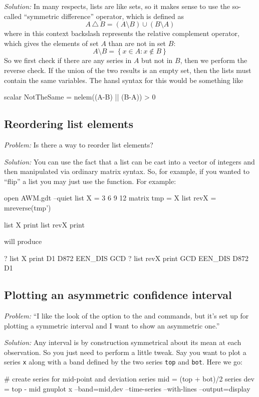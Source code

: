 \emph{Solution:} In many respects, lists are like sets, so it makes
sense to use the so-called ``symmetric difference'' operator, which is
defined as
\[
A\,\triangle\,B = (A \setminus B) \cup (B \setminus A)
\]
where in this context backslash represents the relative complement
operator, which gives the elements of set $A$ than are not in set $B$:
\[
A \setminus B = \left\{ x \in A : x \not \in B \right\}
\]
So we first check if there are any series in $A$ but not in $B$, then
we perform the reverse check. If the union of the two results is an
empty set, then the lists must contain the same variables. The hansl
syntax for this would be something like
\begin{code}
scalar NotTheSame = nelem((A-B) || (B-A)) > 0
\end{code}

\subsection{Reordering list elements}

\emph{Problem:} Is there a way to reorder list elements?

\emph{Solution:} You can use the fact that a list can be cast into
a vector of integers and then manipulated via ordinary matrix
syntax. So, for example, if you wanted to ``flip'' a list you may
just use the  function. For example:
\begin{code}
open AWM.gdt --quiet
list X = 3 6 9 12
matrix tmp = X
list revX = mreverse(tmp')

list X print
list revX print
\end{code}
will produce
\begin{code}
? list X print
D1 D872 EEN_DIS GCD
? list revX print
GCD EEN_DIS D872 D1
\end{code}

\subsection{Plotting an asymmetric confidence interval}

\emph{Problem:} ``I like the look of the  option to the
 and  commands, but it's set up for plotting a
symmetric interval and I want to show an asymmetric one.''

\emph{Solution:} Any interval is by construction symmetrical about its
mean at each observation. So you just need to perform a little
tweak. Say you want to plot a series \texttt{x} along with a band
defined by the two series \texttt{top} and \texttt{bot}. Here we go:
\begin{code}
# create series for mid-point and deviation
series mid = (top + bot)/2
series dev = top - mid
gnuplot x --band=mid,dev --time-series --with-lines --output=display
\end{code}

